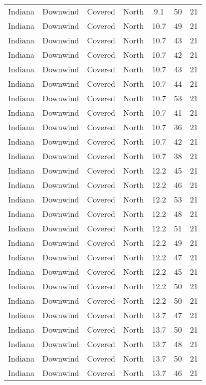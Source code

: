 \documentclass{article}
\begin{document}
\begin{longtable}[H]{ccccccc}
Indiana & Downwind & Covered     & North  & 9.1  & 50 & 21 \\
Indiana & Downwind & Covered     & North  & 10.7 & 49 & 21 \\
Indiana & Downwind & Covered     & North  & 10.7 & 43 & 21 \\
Indiana & Downwind & Covered     & North  & 10.7 & 42 & 21 \\
Indiana & Downwind & Covered     & North  & 10.7 & 43 & 21 \\
Indiana & Downwind & Covered     & North  & 10.7 & 44 & 21 \\
Indiana & Downwind & Covered     & North  & 10.7 & 53 & 21 \\
Indiana & Downwind & Covered     & North  & 10.7 & 41 & 21 \\
Indiana & Downwind & Covered     & North  & 10.7 & 36 & 21 \\
Indiana & Downwind & Covered     & North  & 10.7 & 42 & 21 \\
Indiana & Downwind & Covered     & North  & 10.7 & 38 & 21 \\
Indiana & Downwind & Covered     & North  & 12.2 & 45 & 21 \\
Indiana & Downwind & Covered     & North  & 12.2 & 46 & 21 \\
Indiana & Downwind & Covered     & North  & 12.2 & 53 & 21 \\
Indiana & Downwind & Covered     & North  & 12.2 & 48 & 21 \\
Indiana & Downwind & Covered     & North  & 12.2 & 51 & 21 \\
Indiana & Downwind & Covered     & North  & 12.2 & 49 & 21 \\
Indiana & Downwind & Covered     & North  & 12.2 & 47 & 21 \\
Indiana & Downwind & Covered     & North  & 12.2 & 45 & 21 \\
Indiana & Downwind & Covered     & North  & 12.2 & 50 & 21 \\
Indiana & Downwind & Covered     & North  & 12.2 & 50 & 21 \\
Indiana & Downwind & Covered     & North  & 13.7 & 47 & 21 \\
Indiana & Downwind & Covered     & North  & 13.7 & 50 & 21 \\
Indiana & Downwind & Covered     & North  & 13.7 & 48 & 21 \\
Indiana & Downwind & Covered     & North  & 13.7 & 50 & 21 \\
Indiana & Downwind & Covered     & North  & 13.7 & 46 & 21 \\

\end{longtable}
\end{document}
